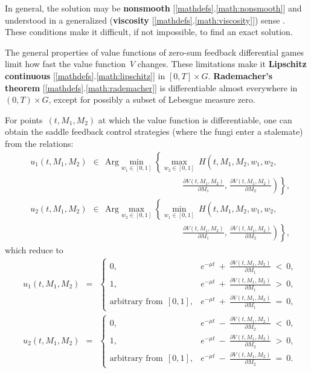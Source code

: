 \documentclass[11pt]{amsart}
\begin{document}
In general, the solution may be 
\textbf{nonsmooth} [\ref{mathdefs}.\ref{math:nonsmooth}] and understood in a generalized (\textbf{viscosity} [\ref{mathdefs}.\ref{math:viscosity}]) sense \cite{FlemingSoner2006,Subbotin1995}. These conditions make it difficult, if not impossible, to find an exact solution.

The general properties of value functions of zero-sum feedback
differential games \cite{BotkinHoffmannTurova2011} limit how fast the value function~$ V $ changes. These limitations make it \textbf{Lipschitz continuous} [\ref{mathdefs}.\ref{math:lipschitz}] in $ [0, T] \times G $. 
\textbf{Rademacher's theorem} [\ref{mathdefs}.\ref{math:rademacher}]
is differentiable almost everywhere in $ (0, T) \times G $, except
for possibly a 
subset of Lebesgue measure zero. 

For points~$ (t, M_1, M_2) $ at which the value function is differentiable,
one can obtain the saddle feedback control strategies (where the fungi enter a stalemate) from the relations:
$$
\begin{aligned}
& u_1(t, M_1, M_2) \:\: \in \:\: \mathrm{Arg} \min_{w_1 \in [0, 1]}
  \left\{ \max_{w_2 \in [0, 1]} \:
H \left( t, M_1, M_2, w_1, w_2, {}^{{}^{{}^{{}^{{}^{}}}}} \right. \right. \\
& \qquad\qquad\qquad\qquad\qquad\qquad\qquad\qquad\qquad
\left. \left. \frac{\partial V(t, M_1, M_2)}{\partial M_1}, \,
  \frac{\partial V(t, M_1, M_2)}{\partial M_2} \right) \right\}, \\
& u_2(t, M_1, M_2) \:\: \in \:\: \mathrm{Arg} \max_{w_2 \in [0, 1]}
  \left\{ \min_{w_1 \in [0, 1]} \:
H \left( t, M_1, M_2, w_1, w_2, {}^{{}^{{}^{{}^{{}^{}}}}} \right. \right. \\
& \qquad\qquad\qquad\qquad\qquad\qquad\qquad\qquad\qquad
\left. \left. \frac{\partial V(t, M_1, M_2)}{\partial M_1}, \,
  \frac{\partial V(t, M_1, M_2)}{\partial M_2} \right) \right\},
\end{aligned}
$$
which reduce to
\begin{equation}
\begin{aligned}
& u_1(t, M_1, M_2) \:\: = \:\: \begin{cases}
0, & e^{-\mu t} \: + \: \frac{\partial V(t, M_1, M_2)}{\partial M_1}
  \: < \: 0, \\
1, & e^{-\mu t} \: + \: \frac{\partial V(t, M_1, M_2)}{\partial M_1}
  \: > \: 0, \\
\mbox{arbitrary from} \:\: [0, 1], & e^{-\mu t} \: + \: \frac{\partial
  V(t, M_1, M_2)}{\partial M_1} \: = \: 0,
\end{cases} \\
& u_2(t, M_1, M_2) \:\: = \:\: \begin{cases}
0, & e^{-\mu t} \: - \: \frac{\partial V(t, M_1, M_2)}{\partial M_2}
  \: < \: 0, \\
1, & e^{-\mu t} \: - \: \frac{\partial V(t, M_1, M_2)}{\partial M_2}
  \: > \: 0, \\
\mbox{arbitrary from} \:\: [0, 1], & e^{-\mu t} \: - \: \frac{\partial V(t,
M_1, M_2)}{\partial M_2} \: = \: 0.
\end{cases}
\end{aligned}  \label{16}
\end{equation}
\end{document}
